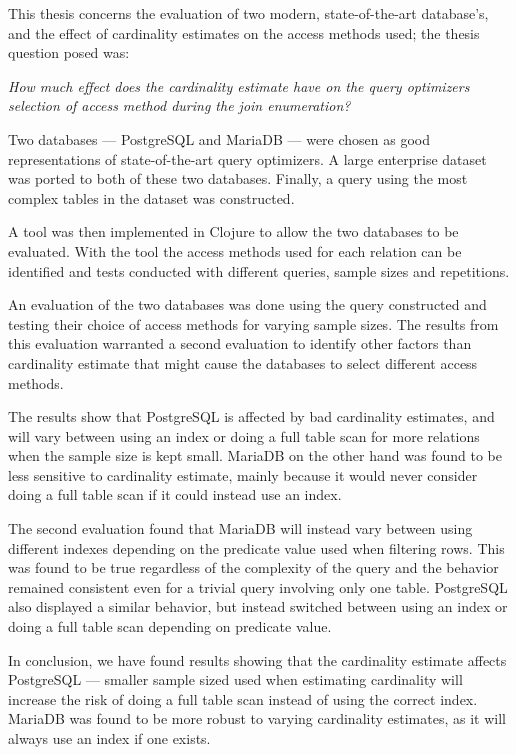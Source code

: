 This thesis concerns the evaluation of two modern, state-of-the-art database's,
and the effect of cardinality estimates on the access methods used; the thesis
question posed was:

\textit{How much effect does the cardinality estimate have on the query optimizers
            selection of access method during the join enumeration?}

Two databases --- PostgreSQL and MariaDB --- were chosen as good representations of
state-of-the-art query optimizers. A large enterprise dataset was ported to both
of these two databases. Finally, a query using the most complex
tables in the dataset was constructed.

A tool was then implemented in Clojure to allow the two databases to be
evaluated. With the tool the access methods used for each relation can be
identified and tests conducted with different queries, sample sizes and
repetitions.

An evaluation of the two databases was done using the query constructed and
testing their choice of access methods for varying sample sizes. The results
from this evaluation warranted a second evaluation to identify other factors
than cardinality estimate that might cause the databases to select different
access methods.

The results show that PostgreSQL is affected by bad cardinality estimates, and
will vary between using an index or doing a full table scan for more relations
when the sample size is kept small. MariaDB on the other hand was found to be
less sensitive to cardinality estimate, mainly because it would never consider
doing a full table scan if it could instead use an index.

The second evaluation found that MariaDB will instead vary between using
different indexes depending on the predicate value used when filtering rows.
This was found to be true regardless of the complexity of the query and the
behavior remained consistent even for a trivial query involving only one table.
PostgreSQL also displayed a similar behavior, but instead switched between using
an index or doing a full table scan depending on predicate value.

In conclusion, we have found results showing that the cardinality estimate
affects PostgreSQL --- smaller sample sized used when estimating cardinality
will increase the risk of doing a full table scan instead of using the correct
index. MariaDB was found to be more robust to varying cardinality estimates,
as it will always use an index if one exists.